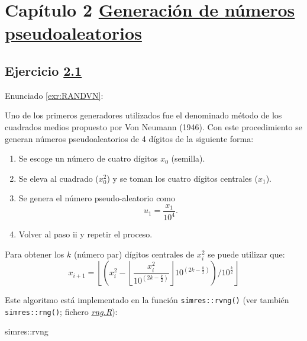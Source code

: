 \documentclass[
  10pt,
]{book}
\newenvironment{Shaded}{\begin{snugshade}}{\end{snugshade}}
\newcommand{\NormalTok}[1]{#1}
\newcommand{\SpecialCharTok}[1]{\textcolor[rgb]{0.00,0.00,0.00}{#1}}
\theoremstyle{break}
\theoremstyle{nonumberplain}
\begin{document}
\hypertarget{capuxedtulo-2-generaciuxf3n-de-nuxfameros-pseudoaleatorios}{%
\section{\texorpdfstring{Capítulo 2 \href{gen-pseudo.html}{Generación de números pseudoaleatorios}}{Capítulo 2 Generación de números pseudoaleatorios}}\label{capuxedtulo-2-generaciuxf3n-de-nuxfameros-pseudoaleatorios}}

\hypertarget{sol-RANDVN}{%
\subsection{\texorpdfstring{Ejercicio \href{ejercicios.html\#exr:RANDVN}{2.1}}{Ejercicio 2.1}}\label{sol-RANDVN}}

Enunciado \ref{exr:RANDVN}:

Uno de los primeros generadores utilizados fue el denominado método de los
cuadrados medios propuesto por Von Neumann (1946). Con este
procedimiento se generan números pseudoaleatorios de 4 dígitos de la
siguiente forma:

\begin{enumerate}
\def\labelenumi{\roman{enumi}.}
\item
  Se escoge un número de cuatro dígitos \(x_0\) (semilla).
\item
  Se eleva al cuadrado (\(x_0^2\)) y se toman los cuatro dígitos centrales (\(x_1\)).
\item
  Se genera el número pseudo-aleatorio como \[u_1=\frac{x_1}{10^{4}}.\]
\item
  Volver al paso ii y repetir el proceso.
\end{enumerate}

Para obtener los \(k\) (número par) dígitos centrales de \(x_{i}^2\)
se puede utilizar que:
\[x_{i+1}=\left\lfloor \left(  x_{i}^2-\left\lfloor \dfrac{x_{i}^2}{10^{(2k-\frac{k}2)}}\right\rfloor 10^{(2k-\frac{k}2)}\right)
/10^{\frac{k}2}\right\rfloor\]

Este algoritmo está implementado en la función \texttt{simres::rvng()} (ver también \texttt{simres::rng()}; fichero \href{R/rng.R}{\emph{rng.R}}):

\begin{Shaded}
\begin{Highlighting}[]
\NormalTok{simres}\SpecialCharTok{::}\NormalTok{rvng}
\end{Highlighting}
\end{Shaded}
\end{document}
